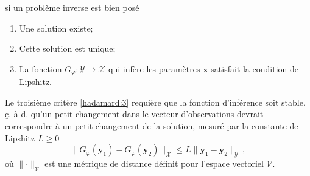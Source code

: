 si un problème inverse est bien posé
\begin{enumerate}[label=(\subscript{H}{{\arabic*}})]
        \item \label{hadamard:1}Une solution existe;
        \item \label{hadamard:2}Cette solution est unique;
        \item \label{hadamard:3} La fonction $G_\varphi: \mathcal{Y} \rightarrow \mathcal{X}$ 
                qui infère les paramètres $\mathbf{x}$ satisfait la condition de Lipshitz.
\end{enumerate}
Le troisième critère \ref{hadamard:3} requière que la fonction d'inférence soit stable, ç.-à-d. qu'un petit changement 
dans le vecteur d'observations devrait correspondre à un petit changement de la solution, mesuré par la constante de Lipshitz
$L \geq 0$
\begin{equation}\label{eq:Lipshitz}
        \lVert G_\varphi(\mathbf{y}_1) - G_\varphi(\mathbf{y}_2)\rVert_{\mathcal{X}} \leq L \lVert \mathbf{y}_1 - \mathbf{y}_2\rVert_{\mathcal{Y}}\, ,
\end{equation}
où $\lVert \cdot \rVert_{\mathcal{V}}$ est une métrique de distance définit pour l'espace vectoriel $\mathcal{V}$.


